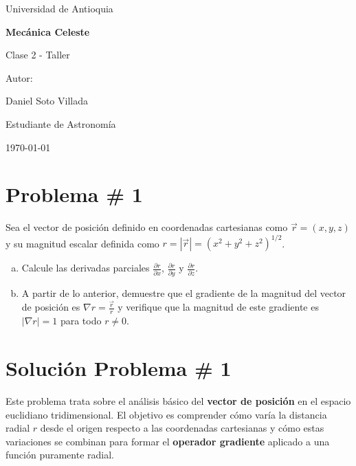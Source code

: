 \documentclass[a4paper]{article}
\begin{document}
\begin{titlepage}
  \centering
  {\Large Universidad de Antioquia\par}
  \vspace{2cm}
  {\huge\bfseries Mecánica Celeste\par}
  \vspace{0.4cm}
  {\Large Clase 2 - Taller\par}
  \vspace{2.5cm}
  {\large Autor:\par}
  \vspace{0.2cm}
  {\large Daniel Soto Villada\par}
  {\large Estudiante de Astronomía\par}
  \vfill
  {\large \today\par}
\end{titlepage}

\newpage
\tableofcontents
\newpage

\section{Problema \# 1}

Sea el vector de posición definido en coordenadas cartesianas como $\vec{r} = (x, y, z)$ y su magnitud escalar definida como $r = |\vec{r}| = (x^2 + y^2 + z^2)^{1/2}$.

\begin{enumerate}[a)]
    \item Calcule las derivadas parciales $\frac{\partial r}{\partial x}$, $\frac{\partial r}{\partial y}$ y $\frac{\partial r}{\partial z}$.
    \item A partir de lo anterior, demuestre que el gradiente de la magnitud del vector de posición es $\nabla r = \frac{\vec{r}}{r}$ y verifique que la magnitud de este gradiente es $|\nabla r| = 1$ para todo $r \neq 0$.
\end{enumerate}

\section*{Solución Problema \# 1}

Este problema trata sobre el análisis básico del \textbf{vector de posición} en el espacio euclidiano tridimensional. El objetivo es comprender cómo varía la distancia radial $r$ desde el origen respecto a las coordenadas cartesianas y cómo estas variaciones se combinan para formar el \textbf{operador gradiente} aplicado a una función puramente radial.
\end{document}
